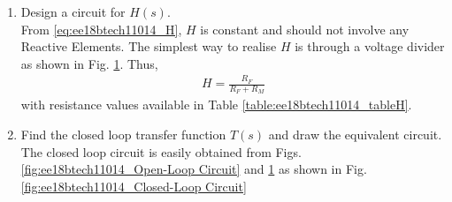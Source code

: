 \begin{enumerate}[label=\thesection.\arabic*.,ref=\thesection.\theenumi]
%
\item Design a circuit for $H(s)$.
\\
\solution From \eqref{eq:ee18btech11014_H}, $H$ is constant and should not involve any Reactive Elements. The simplest way to realise $H$ is through a voltage divider as shown in Fig.  	\ref{fig:ee18btech11014_Feedback Circuit}.  Thus, 
\begin{align}
H = \frac{R_{F}}{R_{F} + R_{M}} 
\end{align}
with resistance values  available in Table \ref{table:ee18btech11014_tableH}.
%
\begin{figure}[ht!]
	\begin{center}
		\resizebox{\columnwidth/2}{!}{}
	\end{center}
	\caption{}
	\label{fig:ee18btech11014_Feedback Circuit}
\end{figure}
%
\begin{table}[!ht]
\centering

\caption{}
\label{table:ee18btech11014_tableH}
\end{table}

\item  Find the closed loop transfer function $T(s)$ and draw the equivalent circuit.
\\
\solution The closed loop circuit is easily obtained from Figs. 		\ref{fig:ee18btech11014_Open-Loop Circuit}
 and \ref{fig:ee18btech11014_Feedback Circuit} as shown in Fig.  	\ref{fig:ee18btech11014_Closed-Loop Circuit}



\end{enumerate}

